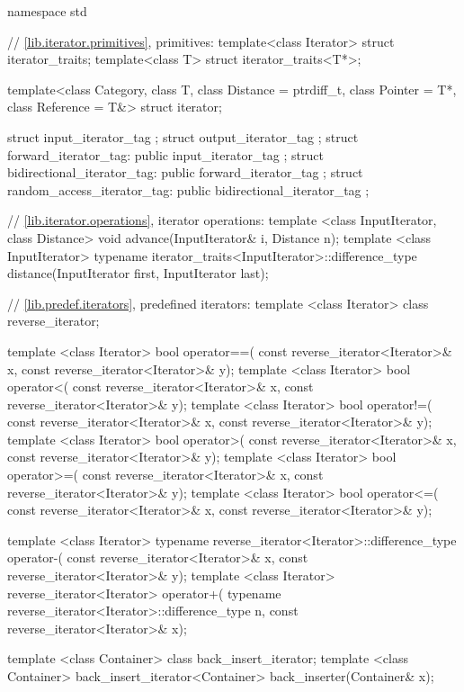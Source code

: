 %
\begin{codeblock}
namespace std {
  // \ref{lib.iterator.primitives}, primitives:
  template<class Iterator> struct iterator_traits;
  template<class T> struct iterator_traits<T*>;

  template<class Category, class T, class Distance = ptrdiff_t,
           class Pointer = T*, class Reference = T&> struct iterator;

  struct input_iterator_tag {};
  struct output_iterator_tag {};
  struct forward_iterator_tag: public input_iterator_tag {};
  struct bidirectional_iterator_tag: public forward_iterator_tag {};
  struct random_access_iterator_tag: public bidirectional_iterator_tag {};

  // \ref{lib.iterator.operations}, iterator operations:
  template <class InputIterator, class Distance>
    void advance(InputIterator& i, Distance n);
  template <class InputIterator>
    typename iterator_traits<InputIterator>::difference_type
    distance(InputIterator first, InputIterator last);

  // \ref{lib.predef.iterators}, predefined iterators:
  template <class Iterator> class reverse_iterator;

  template <class Iterator>
    bool operator==(
      const reverse_iterator<Iterator>& x,
      const reverse_iterator<Iterator>& y);
  template <class Iterator>
    bool operator<(
      const reverse_iterator<Iterator>& x,
      const reverse_iterator<Iterator>& y);
  template <class Iterator>
    bool operator!=(
      const reverse_iterator<Iterator>& x,
      const reverse_iterator<Iterator>& y);
  template <class Iterator>
    bool operator>(
      const reverse_iterator<Iterator>& x,
      const reverse_iterator<Iterator>& y);
  template <class Iterator>
    bool operator>=(
      const reverse_iterator<Iterator>& x,
      const reverse_iterator<Iterator>& y);
  template <class Iterator>
    bool operator<=(
      const reverse_iterator<Iterator>& x,
      const reverse_iterator<Iterator>& y);

  template <class Iterator>
    typename reverse_iterator<Iterator>::difference_type operator-(
      const reverse_iterator<Iterator>& x,
      const reverse_iterator<Iterator>& y);
  template <class Iterator>
    reverse_iterator<Iterator>
      operator+(
        typename reverse_iterator<Iterator>::difference_type n,
        const reverse_iterator<Iterator>& x);

  template <class Container> class back_insert_iterator;
  template <class Container>
    back_insert_iterator<Container> back_inserter(Container& x);

}
\end{codeblock}
